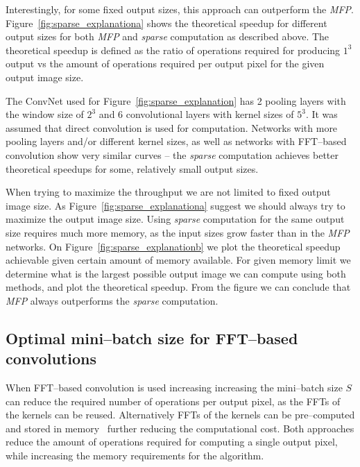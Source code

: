 \documentclass[conference]{IEEEtran}
\begin{document}
  Interestingly, for some fixed output sizes, this approach can
  outperform the \emph{MFP}.
  Figure~\ref{fig:sparse_explanationa} shows the theoretical speedup
  for different output sizes for both \emph{MFP}
  and \emph{sparse} computation as described above.  The theoretical
  speedup is defined as the ratio of operations required for producing
  $1^3$ output vs the amount of operations required per output pixel
  for the given output image size.

  The ConvNet used for Figure~\ref{fig:sparse_explanation} has 2
  pooling layers with the window size of $2^3$ and 6 convolutional
  layers with kernel sizes of $5^3$.  It was assumed that direct
  convolution is used for computation.  Networks with more pooling
  layers and/or different kernel sizes, as well as networks with
  FFT--based convolution show very similar curves -- the \emph{sparse}
  computation achieves better theoretical speedups for some,
  relatively small output sizes.

  When trying to maximize the throughput we are not limited to fixed
  output image size.  As Figure~\ref{fig:sparse_explanationa} suggest
  we should always try to maximize the output image size.  Using
  \emph{sparse} computation for the same output size requires much
  more memory, as the input sizes grow faster than in the
  \emph{MFP} networks.  On
  Figure~\ref{fig:sparse_explanationb} we plot the theoretical speedup
  achievable given certain amount of memory available.  For given
  memory limit we determine what is the largest possible output image
  we can compute using both methods, and plot the theoretical speedup.
  From the figure we can conclude that \emph{MFP}
  always outperforms the \emph{sparse} computation.

\subsection{Optimal mini--batch size for FFT--based convolutions}

  When FFT--based convolution is used increasing increasing the
  mini--batch size $S$ can reduce the required number of operations
  per output pixel, as the FFTs of the kernels can be reused.
  Alternatively FFTs of the kernels can be pre--computed and stored in
  memory~\cite{zlateski2015znn} further reducing the computational
  cost.  Both approaches reduce the amount of operations required for
  computing a single output pixel, while increasing the memory
  requirements for the algorithm.
\end{document}
